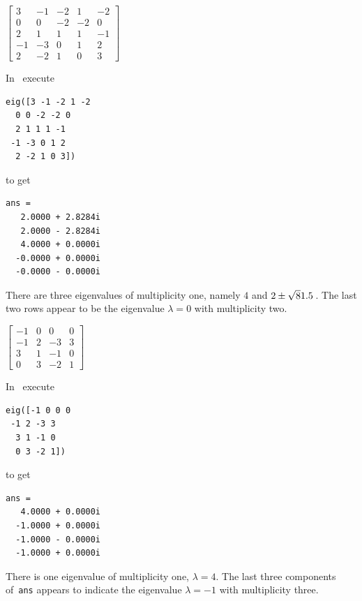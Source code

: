 \begin{example}
\begin{Parts}
\begin{OmitV1}
\item \(\begin{bmatrix}3&-1&-2&1&-2
\\0&0&-2&-2&0
\\2&1&1&1&-1
\\-1&-3&0&1&2
\\2&-2&1&0&3\end{bmatrix}\)
\begin{solution} 
In \script\ execute
\begin{verbatim}
eig([3 -1 -2 1 -2
  0 0 -2 -2 0
  2 1 1 1 -1
 -1 -3 0 1 2
  2 -2 1 0 3])
\end{verbatim}
\setbox\ajrqrbox\hbox{}%
\marginajrbox%
to get
\begin{verbatim}
ans =
   2.0000 + 2.8284i
   2.0000 - 2.8284i
   4.0000 + 0.0000i
  -0.0000 + 0.0000i
  -0.0000 - 0.0000i
\end{verbatim}
There are three eigenvalues of multiplicity one, namely \(4\) and \(2\pm\sqrt81.5\)\,.  
The last two rows appear to be the eigenvalue \(\lambda=0\) with multiplicity two.
\end{solution}
\end{OmitV1}

\item \(\begin{bmatrix}-1&0&0&0
\\-1&2&-3&3
\\3&1&-1&0
\\0&3&-2&1\end{bmatrix}\)
\begin{solution} 
In \script\ execute
\begin{verbatim}
eig([-1 0 0 0
 -1 2 -3 3
  3 1 -1 0
  0 3 -2 1])
\end{verbatim}
\setbox\ajrqrbox\hbox{}%
\marginajrbox%
to get
\begin{verbatim}
ans =
   4.0000 + 0.0000i
  -1.0000 + 0.0000i
  -1.0000 - 0.0000i
  -1.0000 + 0.0000i
\end{verbatim}
There is one eigenvalue of multiplicity one, \(\lambda=4\).  
The last three components of~\verb|ans| appears to indicate the eigenvalue \(\lambda=-1\) with multiplicity three.
\end{solution}

\end{Parts}
\end{example}





